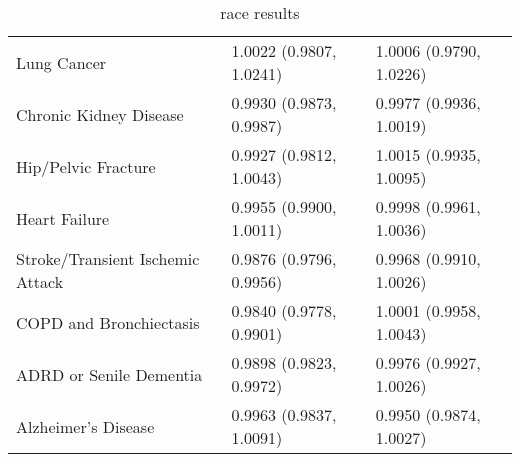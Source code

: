 \begin{table}[ht]
\begin{tabular}{lll}
  Lung Cancer & 1.0022 (0.9807, 1.0241) & 1.0006 (0.9790, 1.0226) \\ 
  Chronic Kidney Disease & 0.9930 (0.9873, 0.9987) & 0.9977 (0.9936, 1.0019) \\ 
  Hip/Pelvic Fracture & 0.9927 (0.9812, 1.0043) & 1.0015 (0.9935, 1.0095) \\ 
  Heart Failure & 0.9955 (0.9900, 1.0011) & 0.9998 (0.9961, 1.0036) \\ 
  Stroke/Transient Ischemic Attack & 0.9876 (0.9796, 0.9956) & 0.9968 (0.9910, 1.0026) \\ 
  COPD and Bronchiectasis & 0.9840 (0.9778, 0.9901) & 1.0001 (0.9958, 1.0043) \\ 
  ADRD or Senile Dementia & 0.9898 (0.9823, 0.9972) & 0.9976 (0.9927, 1.0026) \\ 
  Alzheimer's Disease & 0.9963 (0.9837, 1.0091) & 0.9950 (0.9874, 1.0027) \\ 
   \hline
\end{tabular}
\caption{race results} 
\label{tab:stratified_OR_asian_hispanic}
\end{table}
